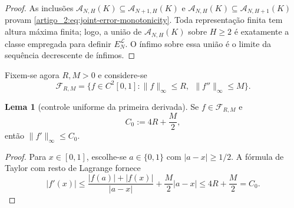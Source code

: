 \documentclass[12pt,a4paper]{article}
\theoremstyle{preciso}
\theoremstyle{definition}
\newcommand{\Aclass}{\mathcal{A}}
\newcommand{\Library}{\mathcal{L}}
\theoremstyle{preciso}
\theoremstyle{preciso}
\newtheorem{lemma}[teorema]{Lema}
\theoremstyle{preciso}
\theoremstyle{preciso}
\theoremstyle{definition}
\theoremstyle{preciso}
\theoremstyle{definition}
\theoremstyle{preciso}
\theoremstyle{preciso}
\theoremstyle{definition}
\begin{document}
\begin{proof}
As inclusões
$\Aclass_{N,H}(K)\subseteq\Aclass_{N+1,H}(K)$ e
$\Aclass_{N,H}(K)\subseteq\Aclass_{N,H+1}(K)$ provam
\eqref{artigo_2:eq:joint-error-monotonicity}. Toda representação finita tem altura
máxima finita; logo, a união de $\Aclass_{N,H}(K)$ sobre $H\ge2$ é exatamente
a classe empregada para definir $E_N^{\Library}$. O ínfimo sobre essa união é o
limite da sequência decrescente de ínfimos.
\end{proof}

Fixem-se agora $R,M>0$ e considere-se
\begin{equation}
 \mathcal{F}_{R,M}=\{f\in C^2[0,1]:\|f\|_\infty\le R,\
                                  \ \|f''\|_\infty\le M\}.
 \label{artigo_2:eq:function-class}
\end{equation}

\begin{lemma}[controle uniforme da primeira derivada]\label{map:artigo_2:3.15}
\label{artigo_2:lem:derivative-control}
Se $f\in\mathcal F_{R,M}$ e
\begin{equation}
 C_0:=4R+\frac M2,
 \label{artigo_2:eq:derivative-constant}
\end{equation}
então $\|f'\|_\infty\le C_0$.
\end{lemma}

\begin{proof}
Para $x\in[0,1]$, escolhe-se $a\in\{0,1\}$ com $|a-x|\ge1/2$. A fórmula de Taylor com
resto de Lagrange fornece
\begin{equation}
 |f'(x)|
 \le\frac{|f(a)|+|f(x)|}{|a-x|}+\frac{M}{2}|a-x|
 \le4R+\frac M2=C_0.
 \label{artigo_2:eq:derivative-control}
\end{equation}
\end{proof}
\end{document}
